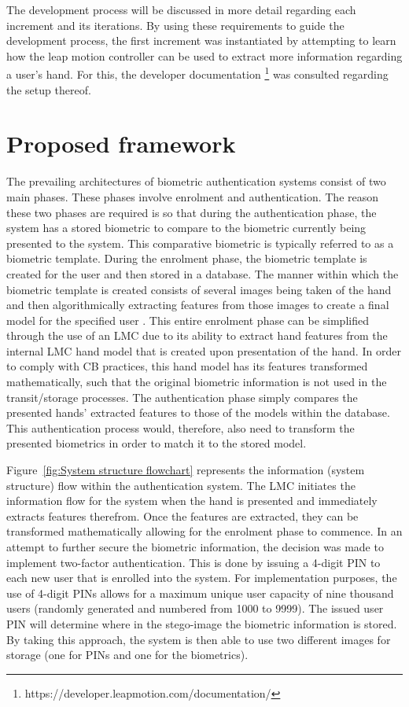 	
The development process will be discussed in more detail regarding each increment and its iterations.
By using these requirements to guide the development process, the first increment was instantiated by attempting to learn how the leap motion controller can be used to extract more information regarding a user’s hand. For this, the developer documentation \footnote{https://developer.leapmotion.com/documentation/} was consulted regarding the setup thereof.

\section{Proposed framework}

The prevailing architectures of biometric authentication systems consist of two main phases. These phases involve enrolment and authentication. The reason these two phases are required is so that during the authentication phase, the system has a stored biometric to compare to the biometric currently being presented to the system. This comparative biometric is typically referred to as a biometric template. During the enrolment phase, the biometric template is created for the user and then stored in a database. The manner within which the biometric template is created consists of several images being taken of the hand and then algorithmically extracting features from those images to create a final model for the specified user \citep{Varchol2007}. This entire enrolment phase can be simplified through the use of an LMC due to its ability to extract hand features from the internal LMC hand model that is created upon presentation of the hand. In order to comply with CB practices, this hand model has its features transformed mathematically, such that the original biometric information is not used in the transit/storage processes. The authentication phase simply compares the presented hands’ extracted features to those of the models within the database. This authentication process would, therefore, also need to transform the presented biometrics in order to match it to the stored model.

Figure~\ref{fig:System structure flowchart} represents the information (system structure) flow within the authentication system. The LMC initiates the information flow for the system when the hand is presented and immediately extracts features therefrom. Once the features are extracted, they can be transformed mathematically allowing for the enrolment phase to commence. In an attempt to further secure the biometric information, the decision was made to implement two-factor authentication. This is done by issuing a 4-digit PIN to each new user that is enrolled into the system. For implementation purposes, the use of 4-digit PINs allows for a maximum unique user capacity of nine thousand users (randomly generated and numbered from 1000 to 9999). The issued user PIN will determine where in the stego-image the biometric information is stored. By taking this approach, the system is then able to use two different images for storage (one for PINs and one for the biometrics). 

